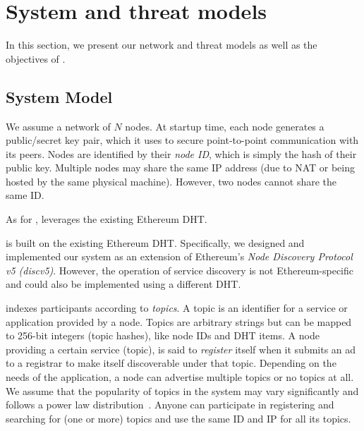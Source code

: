 
\section{System and threat models}
\label{sec:model}

In this section, we present our network and threat models as well as the objectives of \sysname. 

\subsection{System Model}
We assume a network of $N$ nodes. At startup time, each node generates a public/secret key pair, which it uses to secure point-to-point communication with its peers. Nodes are identified by their \emph{node ID}, which is simply the hash of their public key. Multiple nodes may share the same IP address (due to NAT or being hosted by the same physical machine). However, two nodes cannot share the same ID.

As for \discv, \sysname leverages the existing Ethereum DHT.

\sysname is built on the existing Ethereum DHT. Specifically, we designed and implemented our system as an extension of Ethereum's \emph{Node Discovery Protocol v5 (discv5)}. However, the operation of service discovery is not Ethereum-specific and could also be implemented using a different DHT. 

\sysname indexes participants according to \emph{topics}. A topic is an identifier for a
service or application provided by a node. Topics are arbitrary strings but can be mapped to 256-bit integers (topic hashes), like node IDs and DHT items.
A node providing a certain service (topic), is said to \emph{register} itself when it submits an ad to a registrar  to make itself discoverable under that topic. Depending on the needs of the application, a node can advertise multiple topics or no topics at all. We assume that the popularity of topics in the system may vary significantly and follows a power law distribution~\cite{kim2018measuring}. Anyone can participate in registering and searching for (one or more) topics and use the same ID and IP for all its topics. 

